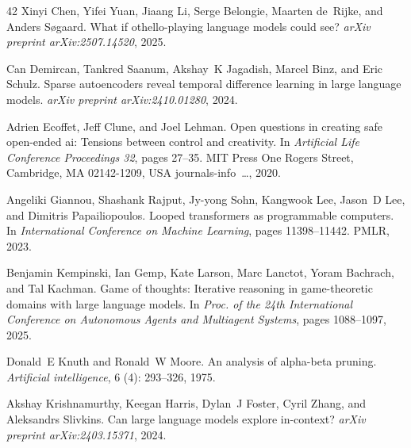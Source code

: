 \begin{thebibliography}{42}
Xinyi Chen, Yifei Yuan, Jiaang Li, Serge Belongie, Maarten de~Rijke, and Anders S{\o}gaard.
\newblock What if othello-playing language models could see?
\newblock \emph{arXiv preprint arXiv:2507.14520}, 2025.

Can Demircan, Tankred Saanum, Akshay~K Jagadish, Marcel Binz, and Eric Schulz.
\newblock Sparse autoencoders reveal temporal difference learning in large language models.
\newblock \emph{arXiv preprint arXiv:2410.01280}, 2024.

Adrien Ecoffet, Jeff Clune, and Joel Lehman.
\newblock Open questions in creating safe open-ended ai: Tensions between control and creativity.
\newblock In \emph{Artificial Life Conference Proceedings 32}, pages 27--35. MIT Press One Rogers Street, Cambridge, MA 02142-1209, USA journals-info~…, 2020.

Angeliki Giannou, Shashank Rajput, Jy-yong Sohn, Kangwook Lee, Jason~D Lee, and Dimitris Papailiopoulos.
\newblock Looped transformers as programmable computers.
\newblock In \emph{International Conference on Machine Learning}, pages 11398--11442. PMLR, 2023.

Benjamin Kempinski, Ian Gemp, Kate Larson, Marc Lanctot, Yoram Bachrach, and Tal Kachman.
\newblock Game of thoughts: Iterative reasoning in game-theoretic domains with large language models.
\newblock In \emph{Proc. of the 24th International Conference on Autonomous Agents and Multiagent Systems}, pages 1088--1097, 2025.

Donald~E Knuth and Ronald~W Moore.
\newblock An analysis of alpha-beta pruning.
\newblock \emph{Artificial intelligence}, 6 (4): 293--326, 1975.

Akshay Krishnamurthy, Keegan Harris, Dylan~J Foster, Cyril Zhang, and Aleksandrs Slivkins.
\newblock Can large language models explore in-context?
\newblock \emph{arXiv preprint arXiv:2403.15371}, 2024.


\end{thebibliography}

